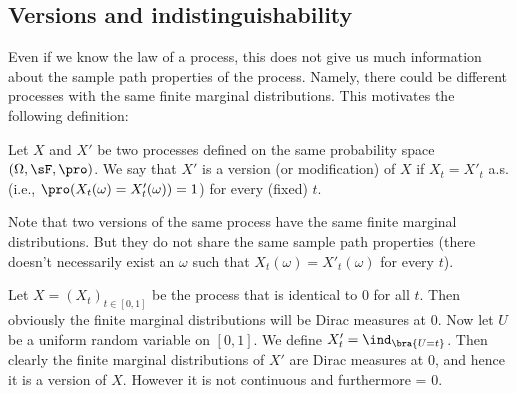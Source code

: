 \subsection{Versions and indistinguishability}

Even if we know the law of a process, this does not give us much information about the sample path properties of the process. Namely, there could be different processes with the same finite marginal distributions. This motivates the following definition:

\begin{definition}\label{def:version_process}
Let $X$ and $X'$ be two processes defined on the same probability space $(\Omega,\sF,\pro)$. We say that $X'$ is a version (or modification) of $X$ if $X_t = X'_t$ a.s. (i.e., $\pro(X_t(\omega) = X'_t(\omega)) = 1$) for every (fixed) $t$.
\end{definition}

\begin{remark}
Note that two versions of the same process have the same finite marginal distributions. But they do not share the same sample path properties (there doesn't necessarily exist an $\omega$ such that $X_t(\omega) = X'_t(\omega)$ for every $t$).
\end{remark}




\begin{example}
Let $X = (X_t)_{t\in [0,1]}$ be the process that is identical to 0 for all $t$. Then obviously the finite marginal distributions will be Dirac measures at 0. Now let $U$ be a uniform random variable on $[0, 1]$. We define $X'_t = \ind_{\bra{U = t}}$. Then clearly the finite marginal distributions of $X'$ are Dirac measures at 0, and hence it is a version of $X$. However it is not continuous and furthermore
\be
\pro{} = 0.
\ee
\end{example}

